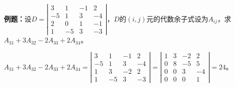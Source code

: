 \documentclass[UTF8, 12pt]{ctexart}
\begin{document}
\textbf{例题：}设$D=\left|\begin{array}{cccc} 
    3 & 1 & -1 & 2 \\
    -5 & 1 & 3 & -4 \\
    2 & 0 & 1 & -1 \\
    1 & -5 & 3 &-3
\end{array}\right|$，$D$的$(i,j)$元的代数余子式设为$A_{ij}$，求$A_{31}+3A_{32}-2A_{33}+2A_{34}$。

$A_{31}+3A_{32}-2A_{33}+2A_{34}=\left|\begin{array}{cccc} 
    3 & 1 & -1 & 2 \\
    -5 & 1 & 3 & -4 \\
    1 & 3 & -2 & 2 \\
    1 & -5 & 3 &-3
\end{array}\right|
=\left|\begin{array}{cccc} 
    1 & 3 & -2 & 2 \\
    0 & 8 & -5 & 5 \\
    0 & 0 & 3 & -4 \\
    0 & 0 & 0 & 1
\end{array}\right|=24$。
\end{document}
